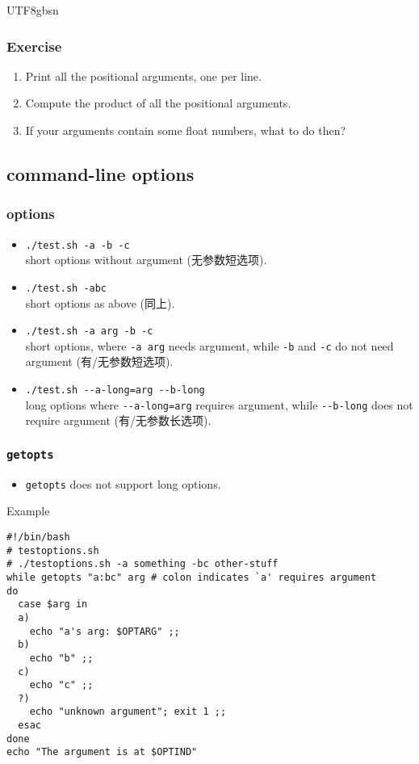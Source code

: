 \documentclass[red]{beamer}
\newcommand*{\lstverb}{\lstinline[style=caret]}
\begin{document}
\begin{CJK*}{UTF8}{gbsn}
\begin{frame}
\frametitle{Exercise}
\begin{enumerate}
	\item Print all the positional arguments, one per line.
	\item Compute the product of all the positional arguments.
	\item If your arguments contain some float numbers, what to 
		do then?
\end{enumerate}
\end{frame}


\subsection{command-line options}

\begin{frame}
\frametitle{options}
\begin{itemize}
	\item \lstinline{./test.sh -a -b -c}\\short options 
		without argument (无参数短选项).
	\vspace{0.2in}
	\item \lstinline{./test.sh -abc}\\short options as above (同上).
	\vspace{0.2in}
	\item \lstinline{./test.sh -a arg -b -c}\\short options, where 
		\lstverb|-a arg| needs argument, while \lstverb|-b| and 
		\lstverb|-c| do not need argument (有/无参数短选项).
	\vspace{0.2in}
	\item \lstinline{./test.sh --a-long=arg --b-long}\\long options 
		where \lstverb|--a-long=arg| requires argument, while 
		\lstverb|--b-long| does not require argument (有/无参数长选项).
\end{itemize}
\end{frame}

\begin{frame}
\frametitle{\texttt{getopts}}
\begin{itemize}
	\item \lstverb|getopts| does not support long options.
\end{itemize}
\begin{block}{\centering Example}
\begin{lstlisting}
#!/bin/bash
# testoptions.sh
# ./testoptions.sh -a something -bc other-stuff
while getopts "a:bc" arg # colon indicates `a' requires argument
do
  case $arg in
  a)
    echo "a's arg: $OPTARG" ;;
  b)
    echo "b" ;;
  c)
    echo "c" ;;
  ?)
    echo "unknown argument"; exit 1 ;;
  esac
done
echo "The argument is at $OPTIND"
\end{lstlisting}
\end{block}
\end{frame}



\end{CJK*}
\end{document}
